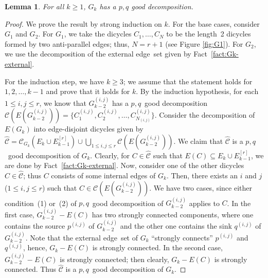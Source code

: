 \documentclass[11pt]{article}
\newtheorem{lemma}[theorem]{Lemma}
\newcommand{\gdecomp}[1]{\mathcal{C}(#1)}
\newcommand{\gdecomplong}[2]{\mathcal{C}_{#2}(#1)}
\newcommand{\gdecompsymbol}{\widehat{\mathcal{C}}}
\begin{document}
\begin{lemma}
\label{lem:pre_CGK}
For all $k\ge1$, $G_k$ has a $p,q$ good decomposition. 
\end{lemma}
\begin{proof}
We prove the result by strong induction on $k$.
For the base cases, consider $G_{1}$ and $G_{2}$.
For $G_{1}$, we take the dicycles $C_1,\dots,C_N$
to be the length~2 dicycles formed by two anti-parallel edges;
thus, $N={r+1}$ (see Figure \ref{fig:G1}).
For $G_{2}$, we use the decomposition of the external edge~set given
by Fact~\ref{fact:Gk-external}.

For the induction step, we have $k\ge3$;
we assume that the statement holds for $1,2,\dots,k-1$ and
prove that it holds for $k$.
By the induction hypothesis, for each $1\leq{i,j}\leq{r}$,
we know that $G^{(i, j)}_{k-2}$ has
a $p,q$~good decomposition
$\gdecomp{E(G^{(i,j)}_{k-2})}=\{C^{(i,j)}_1, C^{(i,j)}_2, \ldots,
	C^{(i,j)}_{N_{(i,j)}}\}$.
Consider the decomposition of $E(G_k)$ into edge-disjoint dicycles
given by
$\gdecompsymbol=\gdecomplong{E_k\cup{E^{[r]}_{k-1}}}{G_k}\cup
	\bigcup_{1\le{i,j}\le{r}} \gdecomp{E(G^{(i,j)}_{k-2})}$.
We claim that $\gdecompsymbol$ is a $p,q$~good decomposition of $G_k$.
Clearly, for $C\in \gdecompsymbol$ such that
$E(C)\subseteq E_k\cup{E^{[r]}_{k-1}}$,
we are done by Fact~\ref{fact:Gk-external}.
Now, consider one of the other dicycles $C\in \gdecompsymbol$;
thus $C$ consists of some internal edges of $G_k$.
Then, there exists an $i$ and $j$ ($1\leq{i,j}\leq{r}$)
such that $C\in \gdecomp{E(G^{(i,j)}_{k-2})}$.
We have two cases, since either condition~(1) or~(2)
of $p,q$~good decomposition of $G^{(i,j)}_{k-2}$ applies to $C$.
In the first case,
$G^{(i, j)}_{k-2}-E(C)$ has two strongly connected components,
where one contains the source $p^{(i, j)}$ of
$G^{(i, j)}_{k-2}$ and
the other one contains the sink $q^{(i, j)}$ of
$G^{(i, j)}_{k-2}$.
Note that the external edge~set of $G_k$ ``strongly connects''
$p^{(i, j)}$ and $q^{(i, j)}$, hence, $G_k-E(C)$ is strongly connected.
In the second case, $G^{(i,j)}_{k-2}-E(C)$ is strongly connected;
then clearly, $G_k-E(C)$ is strongly connected.
Thus $\gdecompsymbol$ is a $p,q$~good decomposition of $G_k$.
\end{proof}
\end{document}
